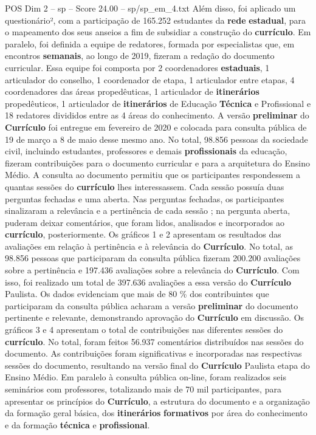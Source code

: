 \begin{textsample}{POS Dim 2 – sp – Score 24.00 – sp/sp\_em\_4.txt}
Além disso, foi aplicado um questionário², com a participação de 165.252 estudantes da \textbf{rede} \textbf{estadual}, para o mapeamento dos seus anseios a fim de subsidiar a construção do \textbf{currículo}.
Em paralelo, foi definida a equipe de redatores, formada por especialistas que, em encontros \textbf{semanais}, ao longo de 2019, fizeram a redação do documento curricular.
Essa equipe foi composta por 2 coordenadores \textbf{estaduais}, 1 articulador do conselho, 1 coordenador de etapa, 1 articulador entre etapas, 4 coordenadores das áreas propedêuticas, 1 articulador de \textbf{itinerários} propedêuticos, 1 articulador de \textbf{itinerários} de Educação \textbf{Técnica} e Profissional e 18 redatores divididos entre as 4 áreas do conhecimento.
A versão \textbf{preliminar} do \textbf{Currículo} foi entregue em fevereiro de 2020 e colocada para consulta pública de 19 de março a 8 de maio desse mesmo ano.
No total, 98.856 pessoas da sociedade civil, incluindo estudantes, professores e demais \textbf{profissionais} da educação, fizeram contribuições para o documento curricular e para a arquitetura do Ensino Médio.
A consulta ao documento permitiu que os participantes respondessem a quantas sessões do \textbf{currículo} lhes interessassem.
Cada sessão possuía duas perguntas fechadas e uma aberta.
Nas perguntas fechadas, os participantes sinalizaram a relevância e a pertinência de cada sessão ; na pergunta aberta, puderam deixar comentários, que foram lidos, analisados e incorporados ao \textbf{currículo}, posteriormente.
Os gráficos 1 e 2 apresentam os resultados das avaliações em relação à pertinência e à relevância do \textbf{Currículo}.
No total, as 98.856 pessoas que participaram da consulta pública fizeram 200.200 avaliações sobre a pertinência e 197.436 avaliações sobre a relevância do \textbf{Currículo}.
Com isso, foi realizado um total de 397.636 avaliações a essa versão do \textbf{Currículo} Paulista.
Os dados evidenciam que mais de 80 \% dos contribuintes que participaram da consulta pública acharam a versão \textbf{preliminar} do documento pertinente e relevante, demonstrando aprovação do \textbf{Currículo} em discussão.
Os gráficos 3 e 4 apresentam o total de contribuições nas diferentes sessões do \textbf{currículo}.
No total, foram feitos 56.937 comentários distribuídos nas sessões do documento.
As contribuições foram significativas e incorporadas nas respectivas sessões do documento, resultando na versão final do \textbf{Currículo} Paulista etapa do Ensino Médio.
Em paralelo à consulta pública on-line, foram realizados seis seminários com professores, totalizando mais de 70 mil participantes, para apresentar os princípios do \textbf{Currículo}, a estrutura do documento e a organização da formação geral básica, dos \textbf{itinerários} \textbf{formativos} por área do conhecimento e da formação \textbf{técnica} e \textbf{profissional}.

\end{textsample}
